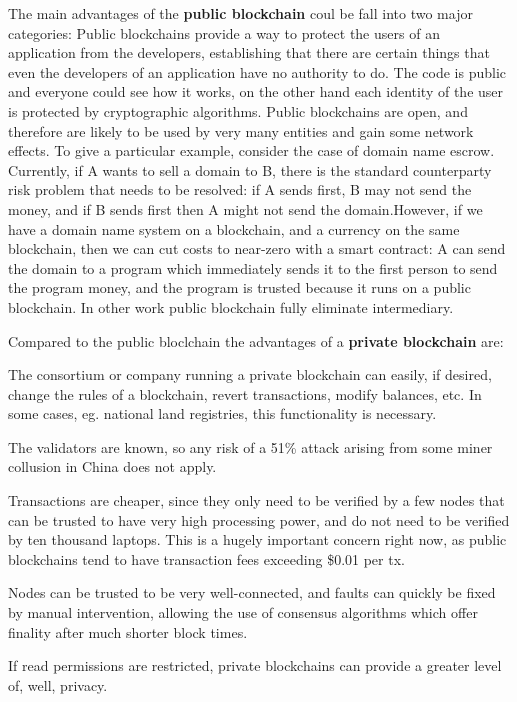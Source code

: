 \begin{outline}[enumerate]
    \1 The main advantages of the \textbf{public blockchain} coul be fall into two major categories:
    \2 Public blockchains provide a way to protect the users of an application from the developers, 
    establishing that there are certain things that even the developers of an application have no 
    authority to do. The code is public and everyone could see how it works, on the other hand
    each identity of the user is protected by cryptographic algorithms.   
    \2 Public blockchains are open, and therefore are likely to be used by very many entities and gain 
    some network effects. To give a particular example, consider the case of domain name escrow. 
    Currently, if A wants to sell a domain to B, there is the standard counterparty risk problem that 
    needs to be resolved: if A sends first, B may not send the money, and if B sends first then A might 
    not send the domain.However, if we have a domain name system on a blockchain, and a currency on the 
    same blockchain, then we can cut costs to near-zero with a smart contract: A can send the domain to 
    a program which immediately sends it to the first person to send the program money, and the program 
    is trusted because it runs on a public blockchain.
    In other work public blockchain fully eliminate intermediary.

    \1 Compared to the public bloclchain the advantages of a \textbf{private blockchain} are:

    \2 The consortium or company running a private blockchain can easily, if desired, change the rules 
    of a blockchain, revert transactions, modify balances, etc. In some cases, eg. national land 
    registries, this functionality is necessary.
    
    \2 The validators are known, so any risk of a 51\% attack arising from some miner collusion in China 
    does not apply.

    \2 Transactions are cheaper, since they only need to be verified by a few nodes that can be trusted 
    to have very high processing power, and do not need to be verified by ten thousand laptops. This is 
    a hugely important concern right now, as public blockchains tend to have transaction fees exceeding 
    \$0.01 per tx.

    \2 Nodes can be trusted to be very well-connected, and faults can quickly be fixed by manual intervention, 
    allowing the use of consensus algorithms which offer finality after much shorter block times. 

    \2 If read permissions are restricted, private blockchains can provide a greater level of, well, privacy.
\end{outline}

